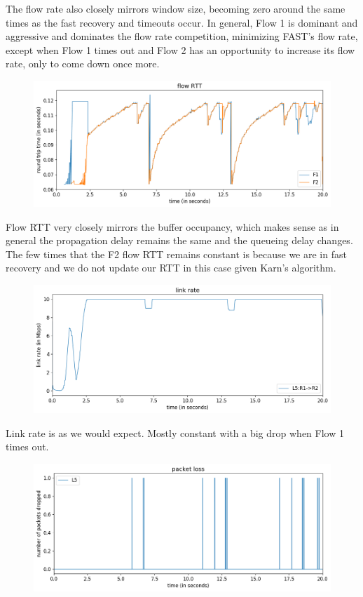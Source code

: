 \documentclass{article}
\begin{document}
The flow rate also closely mirrors window size, becoming zero around the same times as the fast recovery and timeouts occur. In general, Flow 1 is dominant and aggressive and dominates the flow rate competition, minimizing FAST's flow rate, except when Flow 1 times out and Flow 2 has an opportunity to increase its flow rate, only to come down once more.

\begin{figure}[H]
\centering
\includegraphics[width = \textwidth]{"test_case4 flow RTT"}
\end{figure}

Flow RTT very closely mirrors the buffer occupancy, which makes sense as in general the propagation delay remains the same and the queueing delay changes. The few times that the F2 flow RTT remains constant is because we are in fast recovery and we do not update our RTT in this case given Karn's algorithm.

\begin{figure}[H]
\centering
\includegraphics[width = \textwidth]{"test_case4 link rate"}
\end{figure}

Link rate is as we would expect. Mostly constant with a big drop when Flow 1 times out.

\begin{figure}[H]
\centering
\includegraphics[width = \textwidth]{"test_case4 packet loss"}
\end{figure}
\end{document}
